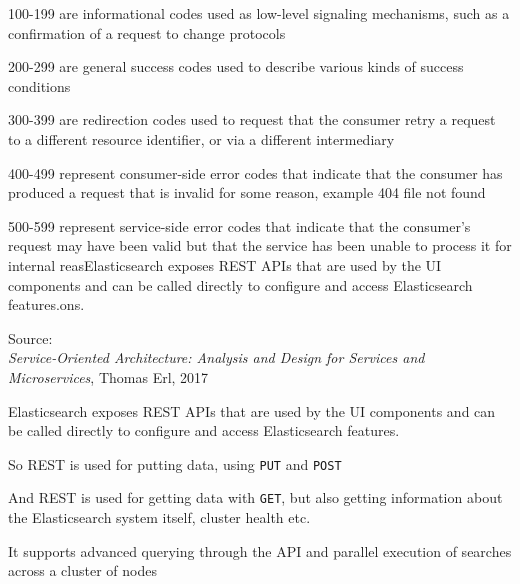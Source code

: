 \documentclass[Screen16to9,17pt]{foils}
\begin{document}

\begin{list2}
\item 100-199 are informational codes used as low-level signaling mechanisms, such as a confirmation of a request to change protocols
\item 200-299 are general success codes used to describe various kinds of success conditions
\item 300-399 are redirection codes used to request that the consumer retry a request to a different resource identifier, or via a different intermediary
\item 400-499 represent consumer-side error codes that indicate that the consumer has produced a request that is invalid for some reason, example 404 file not found
\item 500-599 represent service-side error codes that indicate that the consumer’s request may have been valid but that the service has been unable to process it for internal reasElasticsearch exposes REST APIs that are used by the UI components and can be called directly to configure and access Elasticsearch features.ons.
\end{list2}
Source: {\footnotesize\\
\emph{Service‑Oriented Architecture: Analysis and Design for Services and Microservices}, Thomas Erl, 2017}








\begin{quote}

\end{quote}

\begin{list2}
\item Elasticsearch exposes REST APIs that are used by the UI components and can be called directly to configure and access Elasticsearch features.
\item {}
\item So REST is used for putting data, using \verb+PUT+ and \verb+POST+
\item And REST is used for getting data with \verb+GET+, but also getting information about the Elasticsearch system itself, cluster health etc.
\item It supports advanced querying through the API and parallel execution of searches across a cluster of nodes
\end{list2}
\end{document}
